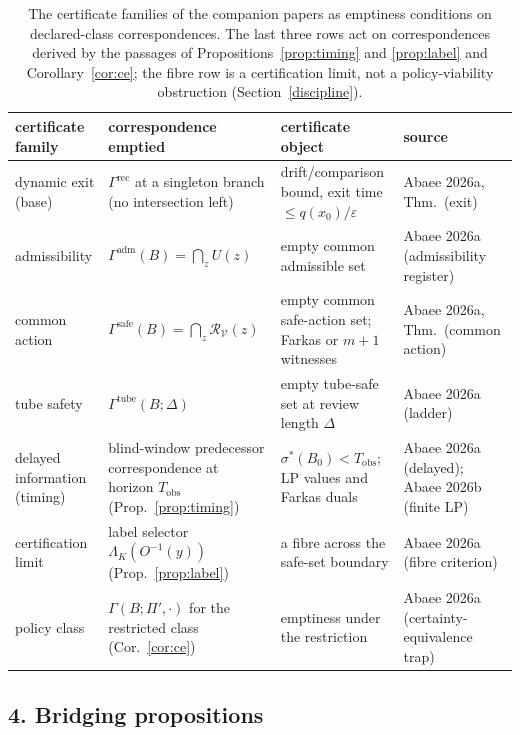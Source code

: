 \documentclass[10pt,twocolumn]{article}
\theoremstyle{definition}
\begin{document}
\begin{table}[t]
\centering
\footnotesize
\begin{tabular}{@{}l|l|l|l@{}}
\toprule
certificate family & correspondence emptied & certificate object & source \\
\midrule
dynamic exit (base) & \(\Gamma^{\mathrm{rec}}\) at a singleton branch (no
intersection left) & drift/comparison bound, exit time \(\le q(x_0)/\varepsilon\) & Abaee 2026a, Thm.\ (exit) \\
admissibility & \(\Gamma^{\mathrm{adm}}(B) = \bigcap_{z} U(z)\) &
empty common admissible set & Abaee 2026a (admissibility register) \\
common action & \(\Gamma^{\mathrm{safe}}(B) = \bigcap_{z}
\mathcal{R}_{\mathcal{V}}(z)\) & empty common safe-action set; Farkas or
\(m{+}1\) witnesses & Abaee 2026a, Thm.\ (common action) \\
tube safety & \(\Gamma^{\mathrm{tube}}(B;\Delta)\) &
empty tube-safe set at review length \(\Delta\) & Abaee 2026a (ladder) \\
delayed information (timing) & blind-window predecessor correspondence at
horizon \(T_{\mathrm{obs}}\) (Prop.~\ref{prop:timing}) &
\(\sigma^{*}(B_0) < T_{\mathrm{obs}}\); LP values and Farkas duals &
Abaee 2026a (delayed); Abaee 2026b (finite LP) \\
certification limit & label selector \(\Lambda_{K}(O^{-1}(y))\)
(Prop.~\ref{prop:label}) & a fibre across the safe-set boundary &
Abaee 2026a (fibre criterion) \\
policy class & \(\Gamma(B; \Pi', \cdot)\) for the restricted class
(Cor.~\ref{cor:ce}) & emptiness under the restriction &
Abaee 2026a (certainty-equivalence trap) \\
\bottomrule
\end{tabular}
\caption{The certificate families of the companion papers as emptiness
conditions on declared-class correspondences. The last three rows act on
correspondences derived by the passages of Propositions~\ref{prop:timing}
and \ref{prop:label} and Corollary~\ref{cor:ce}; the fibre row is a
certification limit, not a policy-viability obstruction
(Section~\ref{discipline}).}
\label{tab:families}
\end{table}

\subsection{4. Bridging propositions}\label{bridges}
\end{document}

